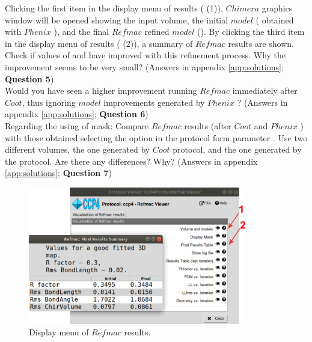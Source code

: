 \begin{itemize}
  Clicking the first item in the display menu of results ( (1)), $Chimera$ graphics window will be opened showing the input volume, the initial $model$ ( obtained with $Phenix$ ), and the final $Refmac$ refined $model$ (). By clicking the third item in the display menu of results ( (2)), a summary of $Refmac$ results are shown. Check if values of  and  have improved with this refinement process. Why the improvement seems to be very small? (Answers in appendix \ref{app:solutions}; \textbf{Question 5})\\
  
  Would you have seen a higher improvement running $Refmac$ immediately after $Coot$, thus ignoring $model$ improvements generated by $Phenix$ ? (Answers in appendix \ref{app:solutions}; \textbf{Question 6})\\
  
  Regarding the using of mask: Compare $Refmac$ results (after $Coot$ and $Phenix$ ) with those obtained selecting the option  in the protocol form parameter . Use two different volumes, the one generated by $Coot$ protocol, and the one generated by the  protocol. Are there any differences? Why? (Answers in appendix \ref{app:solutions}; \textbf{Question 7})\\
  
  \begin{figure}[H]
  \centering 
  \captionsetup{width=.7\linewidth} 
  \includegraphics[width=0.85\textwidth]{Images/Fig32.png}
  \caption{Display menu of $Refmac$ results.}
  \label{fig:refmac_display_results}
  \end{figure}
  

\end{itemize}
